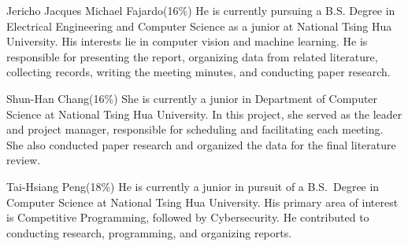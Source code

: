 \documentclass[journal]{IEEEtran}
\begin{document}
\begin{IEEEbiography}{Jericho Jacques Michael Fajardo}(16\%)
He is currently pursuing a B.S. Degree in Electrical Engineering and Computer Science as a junior at National Tsing Hua University. His interests lie in computer vision and machine learning. He is responsible for presenting the report, organizing data from related literature, collecting records, writing the meeting minutes, and conducting paper research.
\end{IEEEbiography}

\begin{IEEEbiography}{Shun-Han Chang}(16\%)
She is currently a junior in Department of Computer Science at National Tsing Hua University. In this project, she served as the leader and project manager, responsible for scheduling and facilitating each meeting. She also conducted paper research and organized the data for the final literature review.
\end{IEEEbiography}

\begin{IEEEbiography}{Tai-Hsiang Peng}(18\%)
He is currently a junior in pursuit of a B.S.~Degree in Computer Science at National Tsing Hua University. His primary area of interest is Competitive Programming, followed by Cybersecurity. He contributed to conducting research, programming, and organizing reports.
\end{IEEEbiography}
\end{document}
